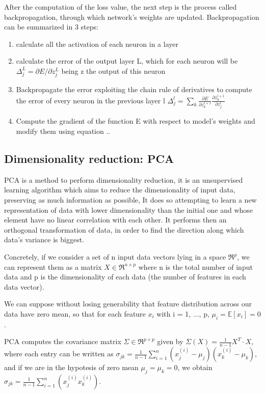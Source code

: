 \documentclass[a4paper,11pt]{article}
\begin{document}
After the computation of the loss value, the next step is the process called backpropagation, through which network's weights are updated.
Backpropagation can be summarized in 3 steps:

\begin{enumerate}
\item calculate all the activation of each neuron in a layer
\item calculate the error of the output layer L, which for each neuron will be $\Delta_j^L =\partial E/\partial z_j^L$ being z the output of this neuron
\item Backpropagate the error exploiting the chain rule of derivatives to compute the error of every neuron in the previous layer l $\Delta_j^l = \sum_k \frac{\partial E}{\partial z_k^{l+1}}\frac{\partial z_k^{l+1}}{\partial z_j^l}$
\item Compute the gradient of the function E with respect to model's weights and modify them using equation ..
\end{enumerate}



\subsection{Dimensionality reduction: PCA}
PCA is a method to perform dimensionality reduction, it is an unsupervised learning algorithm which aims to reduce the dimensionality of input data, preserving as much information as possible,
It does so attempting to learn a new representation of data with lower dimensionality than the initial one and whose element have no linear correlation with each other. It performs then an orthogonal transformation of data, in order to find the direction along which data's variance is biggest.

Concretely, if we consider a set of n input data vectors lying in a space $\Re^p$, we can represent them as a matrix $X \in \Re^{n \times p}$ where n is the total number of input data and p is the dimensionality of each data (the number of features in each data vector).

We can suppose without losing generability that feature distribution across our data have zero mean, so that for each feature $x_i$ with i = 1, ..., p, $\mu_i = \mathbb{E}[x_i]=0$.

PCA computes the covariance matrix $\Sigma \in \Re^{p \times p}$ given by $\Sigma(X) = \frac{1}{n-1} X^T \cdot X$, where each entry can be written as $\sigma_{jk} = \frac{1}{n-1}\sum_{i = 1}^n (x^{(i)}_j - \mu_j)(x^{(i)}_k - \mu_k)$, and if we are in the hypotesis of zero mean $\mu_j = \mu_k = 0$, we obtain $\sigma_{jk} = \frac{1}{n-1}\sum_{i = 1}^n (x^{(i)}_j x^{(i)}_k)$.
\end{document}
